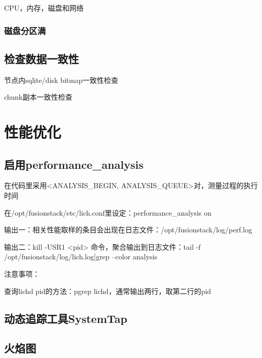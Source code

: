CPU，内存，磁盘和网络

\subsubsection{磁盘分区满}




\subsection{检查数据一致性}

节点内sqlite/disk bitmap一致性检查

chunk副本一致性检查

\section{性能优化}

\subsection{启用performance\_analysis}

\begin{enumbox}
\item 在代码里采用<ANALYSIS\_BEGIN, ANALYSIS\_QUEUE>对，测量过程的执行时间
\item 在/opt/fusionstack/etc/lich.conf里设定：performance\_analysis on
\item 输出一：相关性能取样的条目会出现在日志文件：/opt/fusionstack/log/perf.log
\item 输出二：kill -USR1 <pid> 命令，聚合输出到日志文件：tail -f /opt/fusionstack/log/lich.log|grep --color analysis
\end{enumbox}

注意事项：
\begin{compactenum}
\item 查询lichd pid的方法：pgrep lichd，通常输出两行，取第二行的pid
\end{compactenum}

\subsection{动态追踪工具SystemTap}

\subsection{火焰图}
